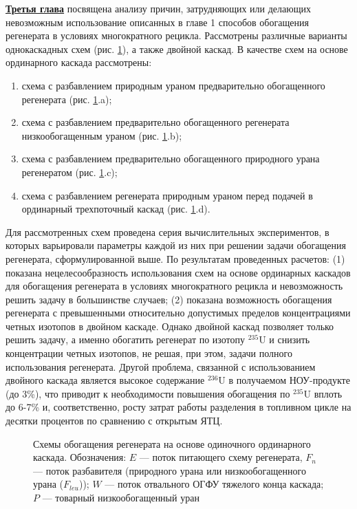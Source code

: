\underline{\textbf{Третья глава}} посвящена анализу причин, затрудняющих или делающих невозможным использование описанных в главе 1 способов обогащения регенерата в условиях многократного рецикла. Рассмотрены различные варианты однокаскадных схем (рис. \ref{fig:diagram1ch3}), а также двойной каскад. В качестве схем на основе ординарного каскада рассмотрены:

\begin{enumerate}
  \item схема с разбавлением природным ураном предварительно обогащенного регенерата (рис. \ref{fig:diagram1ch3}.a);
  \item схема с разбавлением предварительно обогащенного регенерата низкообогащенным ураном (рис. \ref{fig:diagram1ch3}.b);
  \item схема с разбавлением предварительно обогащенного природного урана регенератом (рис. \ref{fig:diagram1ch3}.c);
  \item схема с разбавлением регенерата природным ураном перед подачей в ординарный трехпоточный каскад (рис. \ref{fig:diagram1ch3}.d).
\end{enumerate}

Для рассмотренных схем проведена серия вычислительных экспериментов, в которых варьировали параметры каждой из них при решении задачи обогащения регенерата, сформулированной выше. По результатам проведенных расчетов: (1) показана нецелесообразность использования схем на основе ординарных каскадов для обогащения регенерата в условиях многократного рецикла и невозможность решить задачу в большинстве случаев; (2) показана возможность обогащения регенерата с превышенными относительно допустимых пределов концентрациями четных изотопов в двойном каскаде. Однако двойной каскад позволяет только решить задачу, а именно обогатить регенерат по изотопу $^{235}$U и снизить концентрации четных изотопов, не решая, при этом, задачи полного использования регенерата. Другой проблема, связанной с использованием двойного каскада является высокое содержание $^{236}$U в получаемом НОУ-продукте (до 3\%), что приводит к необходимости повышения обогащения по $^{235}$U вплоть до 6-7\% и, соответственно, росту затрат работы разделения в топливном цикле на десятки процентов по сравнению с открытым ЯТЦ.

\begin{figure}[ht]
  \caption{Схемы обогащения регенерата на основе одиночного ординарного каскада. Обозначения: $E$ --- поток питающего схему регенерата, $F_n$ --- поток разбавителя (природного урана или низкообогащенного урана ($F_{leu}$)); $W$ --- поток отвального ОГФУ тяжелого конца каскада; $P$ --- товарный низкообогащенный уран}\label{fig:diagram1ch3}
\end{figure}

